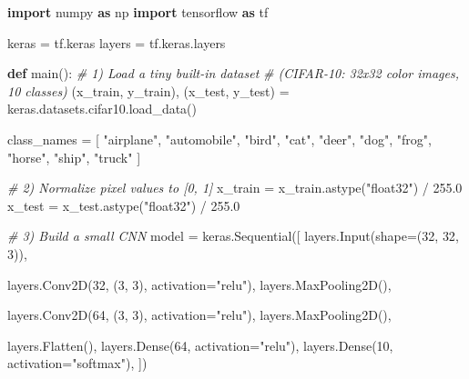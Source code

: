 \documentclass[
  12pt,
  letterpaper,
  oneside]{report}
\newenvironment{Shaded}{}{}
\newcommand{\CommentTok}[1]{\textcolor[rgb]{0.38,0.63,0.69}{\textit{#1}}}
\newcommand{\DecValTok}[1]{\textcolor[rgb]{0.25,0.63,0.44}{#1}}
\newcommand{\FloatTok}[1]{\textcolor[rgb]{0.25,0.63,0.44}{#1}}
\newcommand{\ImportTok}[1]{\textcolor[rgb]{0.00,0.50,0.00}{\textbf{#1}}}
\newcommand{\KeywordTok}[1]{\textcolor[rgb]{0.00,0.44,0.13}{\textbf{#1}}}
\newcommand{\NormalTok}[1]{#1}
\newcommand{\OperatorTok}[1]{\textcolor[rgb]{0.40,0.40,0.40}{#1}}
\newcommand{\StringTok}[1]{\textcolor[rgb]{0.25,0.44,0.63}{#1}}
\begin{document}
\begin{Shaded}
\begin{Highlighting}[]
\ImportTok{import}\NormalTok{ numpy }\ImportTok{as}\NormalTok{ np}
\ImportTok{import}\NormalTok{ tensorflow }\ImportTok{as}\NormalTok{ tf}

\NormalTok{keras }\OperatorTok{=}\NormalTok{ tf.keras}
\NormalTok{layers }\OperatorTok{=}\NormalTok{ tf.keras.layers}

\KeywordTok{def}\NormalTok{ main():}
    \CommentTok{\# 1) Load a tiny built{-}in dataset}
    \CommentTok{\#    (CIFAR{-}10: 32x32 color images, 10 classes)}
\NormalTok{    (x\_train, y\_train), (x\_test, y\_test) }\OperatorTok{=}\NormalTok{ keras.datasets.cifar10.load\_data()}

\NormalTok{    class\_names }\OperatorTok{=}\NormalTok{ [}
        \StringTok{"airplane"}\NormalTok{, }\StringTok{"automobile"}\NormalTok{, }\StringTok{"bird"}\NormalTok{, }\StringTok{"cat"}\NormalTok{, }\StringTok{"deer"}\NormalTok{,}
        \StringTok{"dog"}\NormalTok{, }\StringTok{"frog"}\NormalTok{, }\StringTok{"horse"}\NormalTok{, }\StringTok{"ship"}\NormalTok{, }\StringTok{"truck"}
\NormalTok{    ]}

    \CommentTok{\# 2) Normalize pixel values to [0, 1]}
\NormalTok{    x\_train }\OperatorTok{=}\NormalTok{ x\_train.astype(}\StringTok{"float32"}\NormalTok{) }\OperatorTok{/} \FloatTok{255.0}
\NormalTok{    x\_test }\OperatorTok{=}\NormalTok{ x\_test.astype(}\StringTok{"float32"}\NormalTok{) }\OperatorTok{/} \FloatTok{255.0}

    \CommentTok{\# 3) Build a small CNN}
\NormalTok{    model }\OperatorTok{=}\NormalTok{ keras.Sequential([}
\NormalTok{        layers.Input(shape}\OperatorTok{=}\NormalTok{(}\DecValTok{32}\NormalTok{, }\DecValTok{32}\NormalTok{, }\DecValTok{3}\NormalTok{)),}

\NormalTok{        layers.Conv2D(}\DecValTok{32}\NormalTok{, (}\DecValTok{3}\NormalTok{, }\DecValTok{3}\NormalTok{), activation}\OperatorTok{=}\StringTok{"relu"}\NormalTok{),}
\NormalTok{        layers.MaxPooling2D(),}

\NormalTok{        layers.Conv2D(}\DecValTok{64}\NormalTok{, (}\DecValTok{3}\NormalTok{, }\DecValTok{3}\NormalTok{), activation}\OperatorTok{=}\StringTok{"relu"}\NormalTok{),}
\NormalTok{        layers.MaxPooling2D(),}

\NormalTok{        layers.Flatten(),}
\NormalTok{        layers.Dense(}\DecValTok{64}\NormalTok{, activation}\OperatorTok{=}\StringTok{"relu"}\NormalTok{),}
\NormalTok{        layers.Dense(}\DecValTok{10}\NormalTok{, activation}\OperatorTok{=}\StringTok{"softmax"}\NormalTok{),}
\NormalTok{    ])}


\end{Highlighting}
\end{Shaded}
\end{document}

